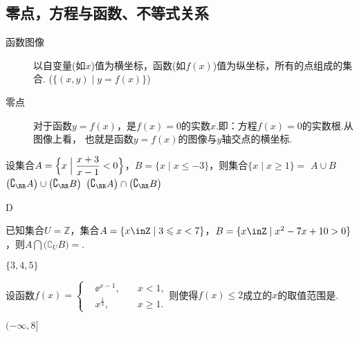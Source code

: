   \subsection{零点，方程与函数、不等式关系}
    \begin{description}
      \item [函数图像] 以自变量(如$x$)值为横坐标，函数(如$f(x)$)值为纵坐标，所有的点组成的集合.
        ($\{(x,y)\mid y=f(x)\}$)
      \item [零点]对于函数$y=f(x)$，是$f(x)=0$的实数$x$.即：方程$f(x)=0$的实数根.从图像上看，
        也就是函数$y=f(x)$的图像与$y$轴交点的横坐标.
    \end{description}
    \begin{exercise}
      \item %
        设集合$A=\Bigl\{x\Bigm| \dfrac{x+3}{x-1}<0\Bigr\}$，$B=\{x\mid x\leqslant{-3}\}$，则集合$\{x\mid x\geqslant1\}=$\xz
         {$A\cup B$}
         {$\bigl(\complement_{\RR}A\bigr)\cup \bigl(\complement_{\RR}B\bigr)$}
         {$\bigl(\complement_{\RR}A\bigr)\cap \bigl(\complement_{\RR}B\bigr)$}
        \begin{answer}
          D
        \end{answer}
      \item %
        已知集合$U=\mathbb{Z}$，集合$A=\{x\inZ\mid 3\leqslant x<7\}$，$B=\{x\inZ\mid x^2-7x+10>0\}$，则$A\bigcap\bigl(\complement_UB\bigr)=$\tk.
        \begin{answer}
          $\{3,4,5\}$
        \end{answer}
      \item %
        设函数$f(x)=\left\{\begin{aligned}
        &\ee^{x-1},\quad &x<1,\\
        &x^{\frac13},\quad &x\geqslant1.
        \end{aligned}\right.$则使得$f(x)\leqslant2$成立的$x$的取值范围是\tk.
        \begin{answer}
          $(-\infty,8]$
        \end{answer}
    \end{exercise}
